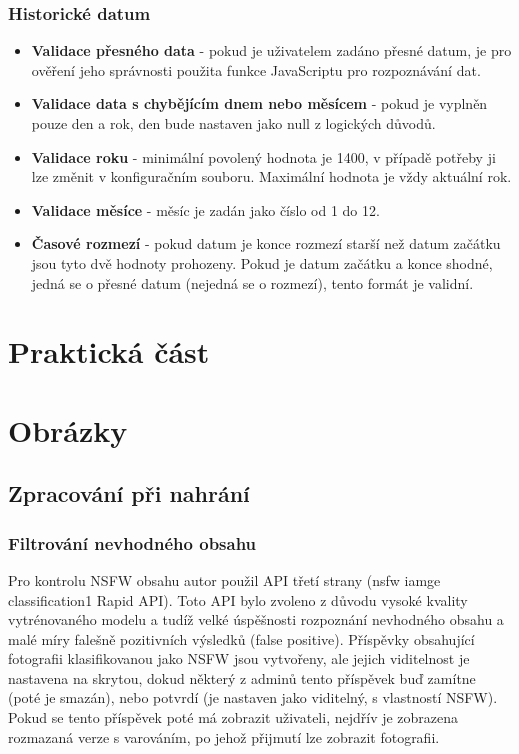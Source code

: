 \documentclass[12pt, a4paper,
 twoside,        %
 openright
]{report}
\begin{document}
\subsection{Historické datum}
    \begin{itemize}
        \item \textbf{Validace přesného data} - pokud je uživatelem zadáno přesné datum, je pro ověření jeho správnosti použita funkce JavaScriptu pro rozpoznávání dat.
        \item \textbf{Validace data s chybějícím dnem nebo měsícem} - pokud je vyplněn pouze den a rok, den bude nastaven jako null z logických důvodů. 
        \item \textbf{Validace roku} - minimální povolený hodnota je 1400, v případě potřeby ji lze změnit v konfiguračním souboru. Maximální hodnota je vždy aktuální rok.        
        \item \textbf{Validace měsíce} - měsíc je zadán jako číslo od 1 do 12.
        \item \textbf{Časové rozmezí} - pokud datum je konce rozmezí starší než datum začátku jsou tyto dvě hodnoty prohozeny. Pokud je datum začátku a konce shodné, jedná se o přesné datum (nejedná se o rozmezí), tento formát je validní.
    \end{itemize}


\chapter{Praktická část}


\chapter{Obrázky}
\section{Zpracování při nahrání}
\subsection{Filtrování nevhodného obsahu}\label{section:nsfw_filter}
Pro kontrolu NSFW obsahu autor použil API třetí strany (nsfw iamge classification1 Rapid API). Toto API bylo zvoleno z důvodu vysoké kvality vytrénovaného modelu a tudíž velké úspěšnosti rozpoznání nevhodného obsahu a malé míry falešně pozitivních výsledků (false positive). Příspěvky obsahující fotografii klasifikovanou jako NSFW jsou vytvořeny, ale jejich viditelnost je nastavena na skrytou, dokud některý z adminů tento příspěvek buď zamítne (poté je smazán), nebo potvrdí (je nastaven jako viditelný, s vlastností NSFW). Pokud se tento příspěvek poté má zobrazit uživateli, nejdřív je zobrazena rozmazaná verze s varováním, po jehož přijmutí lze zobrazit fotografii.
\end{document}
